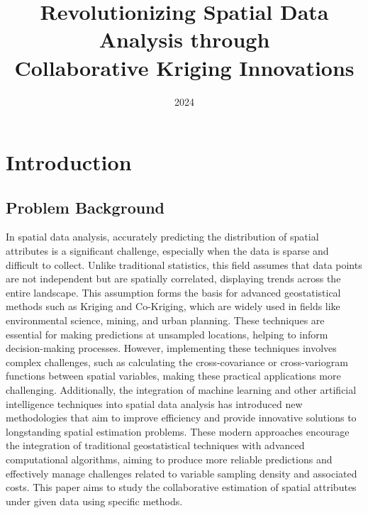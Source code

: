 \documentclass{swmcmthesis}
\title{Revolutionizing Spatial Data Analysis through \\ Collaborative Kriging Innovations} %
\date{2024}
\begin{document}
\maketitle
\tableofcontents

\newpage

\section{Introduction}
\subsection{Problem Background}
In spatial data analysis, accurately predicting the distribution of spatial attributes is a significant challenge, especially when the data is sparse and difficult to collect. Unlike traditional statistics, this field assumes that data points are not independent but are spatially correlated, displaying trends across the entire landscape. This assumption forms the basis for advanced geostatistical methods such as Kriging and Co-Kriging, which are widely used in fields like environmental science, mining, and urban planning. These techniques are essential for making predictions at unsampled locations, helping to inform decision-making processes. However, implementing these techniques involves complex challenges, such as calculating the cross-covariance or cross-variogram functions between spatial variables, making these practical applications more challenging. Additionally, the integration of machine learning and other artificial intelligence techniques into spatial data analysis has introduced new methodologies that aim to improve efficiency and provide innovative solutions to longstanding spatial estimation problems. These modern approaches encourage the integration of traditional geostatistical techniques with advanced computational algorithms, aiming to produce more reliable predictions and effectively manage challenges related to variable sampling density and associated costs. This paper aims to study the collaborative estimation of spatial attributes under given data using specific methods.
\end{document}
